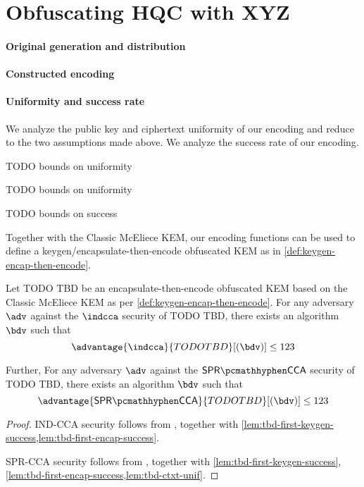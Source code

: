 \section{Obfuscating HQC with XYZ} \label{sec:tbd}
\paragraph{Original generation and distribution}
\paragraph{Constructed encoding}
\paragraph{Uniformity and success rate}

We analyze the public key and ciphertext uniformity of our encoding and reduce to the two assumptions made above. We analyze the success rate of our encoding.

\begin{lemma}
\label{lem:tbd-pk-unif}
    TODO bounds on uniformity
\end{lemma}

\begin{lemma}
\label{lem:tbd-ctxt-unif}
    TODO bounds on uniformity
\end{lemma}

\begin{lemma}[[First-encaps success probability of TODO TBD]
\label{lem:tbd-first-encap-success}
    TODO bounds on success
\end{lemma}

Together with the Classic McEliece KEM, our encoding functions can be used to define a keygen/encapsulate-then-encode obfuscated KEM as in \cref{def:keygen-encap-then-encode}.

\begin{theorem}
    Let TODO TBD be an encapsulate-then-encode obfuscated KEM based on the Classic McEliece KEM as per \cref{def:keygen-encap-then-encode}. For any adversary $\adv$ against the $\indcca$ security of TODO TBD, there exists an algorithm $\bdv$ such that
    \[ \advantage{\indcca}{TODO TBD}[(\bdv)] \leq 123 \]

    Further,  For any adversary $\adv$ against the $\sprcca$ security of TODO TBD, there exists an algorithm $\bdv$ such that
    \[ \advantage{\sprcca}{TODO TBD}[(\bdv)] \leq 123 \]
\end{theorem}
\begin{proof}
    IND-CCA security follows from \cite[Theorem~2.12]{CCS:GunSteVei24}, together with \cref{lem:tbd-first-keygen-success,lem:tbd-first-encap-success}.
    
    SPR-CCA security follows from \cite[Theorem~2.13]{CCS:GunSteVei24}, together with \cref{lem:tbd-first-keygen-success}, \ref{lem:tbd-first-encap-success,lem:tbd-ctxt-unif}.
\end{proof}